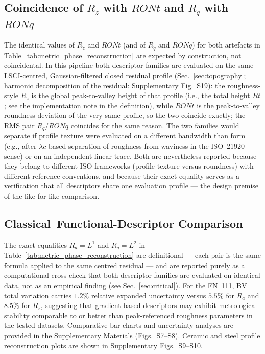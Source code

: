 \documentclass[review]{elsarticle}
\begin{document}
\subsection{Coincidence of $R_z$ with $RONt$ and $R_q$ with $RONq$}
\label{sec:rz_ront}
The identical values of $R_z$ and $RONt$ (and of $R_q$ and $RONq$) for both artefacts in Table~\ref{tab:metric_phase_reconstruction} are expected by construction, not coincidental. In this pipeline both descriptor families are evaluated on the same LSCI-centred, Gaussian-filtered closed residual profile (Sec.~\ref{sec:topography}; harmonic decomposition of the residual: Supplementary Fig.~S19): the roughness-style $R_z$ is the global peak-to-valley height of that profile (i.e., the total height $Rt$; see the implementation note in the definition), while $RONt$ is the peak-to-valley roundness deviation of the very same profile, so the two coincide exactly; the RMS pair $R_q$/$RONq$ coincides for the same reason. The two families would separate if profile texture were evaluated on a different bandwidth than form (e.g., after $\lambda c$-based separation of roughness from waviness in the ISO~21920 sense) or on an independent linear trace. Both are nevertheless reported because they belong to different ISO frameworks (profile texture versus roundness) with different reference conventions, and because their exact equality serves as a verification that all descriptors share one evaluation profile — the design premise of the like-for-like comparison.

\subsection{Classical--Functional-Descriptor Comparison}
The exact equalities $R_a=L^1$ and $R_q=L^2$ in Table~\ref{tab:metric_phase_reconstruction} are definitional — each pair is the same formula applied to the same centred residual — and are reported purely as a computational cross-check that both descriptor families are evaluated on identical data, not as an empirical finding (see Sec.~\ref{sec:critical}). For the FN~111, BV total variation carries $1.2\%$ relative expanded uncertainty versus $5.5\%$ for $R_a$ and $8.5\%$ for $R_z$, suggesting that gradient-based descriptors may exhibit metrological stability comparable to or better than peak-referenced roughness parameters in the tested datasets. Comparative bar charts and uncertainty analyses are provided in the Supplementary Materials (Figs.~S7--S8). Ceramic and steel profile reconstruction plots are shown in Supplementary Figs.~S9--S10.
\end{document}
